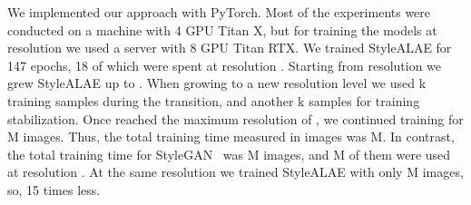 We implemented our approach with PyTorch. Most of the experiments were conducted on a machine with 4 GPU Titan X, but for training the models at resolution  we used a server with 8 GPU Titan RTX. We trained StyleALAE for 147 epochs, 18 of which were spent at resolution . Starting from resolution  we grew StyleALAE up to . When growing to a new resolution level we used k training samples during the transition, and another k samples for training stabilization. Once reached the maximum resolution of , we continued training for M images. Thus, the total training time measured in images was M. In contrast, the total training time for StyleGAN~\cite{Karras2019} was M images, and M of them were used at resolution . At the same resolution we trained StyleALAE with only M images, so, 15 times less.

\begin{table}[t!]
\centering
{}
\caption{\textbf{PPL.} Perceptual path lengths on FFHQ measured in the  and the  spaces (lower is better).
}
\label{tab:disentangle}
\vspace{-4mm}
\end{table}
